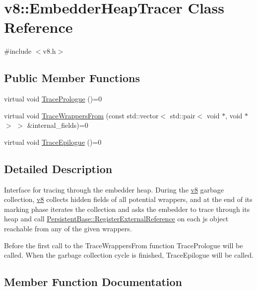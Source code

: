\hypertarget{classv8_1_1_embedder_heap_tracer}{}\section{v8\+:\+:Embedder\+Heap\+Tracer Class Reference}
\label{classv8_1_1_embedder_heap_tracer}


{\ttfamily \#include $<$v8.\+h$>$}

\subsection*{Public Member Functions}
\begin{DoxyCompactItemize}
\item 
virtual void \hyperlink{classv8_1_1_embedder_heap_tracer_af4f747aa1d77a0d2f341846b94f6b1ce}{Trace\+Prologue} ()=0
\item 
virtual void \hyperlink{classv8_1_1_embedder_heap_tracer_a94aa3bb3651e969f0f0726ee1c79cc3c}{Trace\+Wrappers\+From} (const std\+::vector$<$ std\+::pair$<$ void $\ast$, void $\ast$ $>$ $>$ \&internal\+\_\+fields)=0
\item 
virtual void \hyperlink{classv8_1_1_embedder_heap_tracer_a61b8dc3260247e2c47af8ad8f5775991}{Trace\+Epilogue} ()=0
\end{DoxyCompactItemize}


\subsection{Detailed Description}
Interface for tracing through the embedder heap. During the \hyperlink{namespacev8}{v8} garbage collection, \hyperlink{namespacev8}{v8} collects hidden fields of all potential wrappers, and at the end of its marking phase iterates the collection and asks the embedder to trace through its heap and call \hyperlink{classv8_1_1_persistent_base_a14c051e0080bbe7fbe02be35865b9923}{Persistent\+Base\+::\+Register\+External\+Reference} on each js object reachable from any of the given wrappers.

Before the first call to the Trace\+Wrappers\+From function Trace\+Prologue will be called. When the garbage collection cycle is finished, Trace\+Epilogue will be called. 

\subsection{Member Function Documentation}

